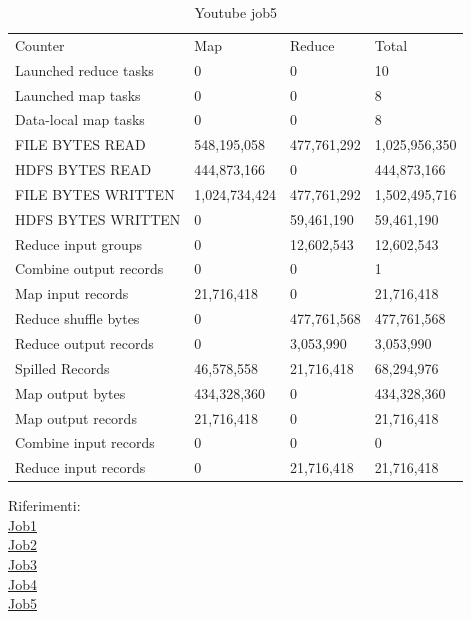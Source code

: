 \documentclass[paper=a4, fontsize=11pt]{scrartcl}	%
\numberwithin{equation}{section}															%
\numberwithin{figure}{section}																%
\numberwithin{table}{section}																%
\begin{document}
\begin{table}[]
	\centering
	\caption{Youtube job5}
	\label{my-label}
	\begin{tabular}{llll}
		Counter&	Map&	Reduce&	Total\\
		Launched reduce tasks&	0&	0&	10\\
		Launched map tasks&	0&	0&	8\\
		Data-local map tasks&	0&	0&	8\\
		FILE BYTES READ&	548,195,058&	477,761,292&	1,025,956,350\\
		HDFS BYTES READ&	444,873,166&	0&	444,873,166\\
		FILE BYTES WRITTEN&	1,024,734,424&	477,761,292&	1,502,495,716\\
		HDFS BYTES WRITTEN&	0&	59,461,190&	59,461,190\\
		Reduce input groups&	0&	12,602,543&	12,602,543\\
		Combine output records&	0&	0&	1\\
		Map input records&	21,716,418&	0&	21,716,418\\
		Reduce shuffle bytes&	0&	477,761,568&	477,761,568\\
		Reduce output records&	0&	3,053,990&	3,053,990\\
		Spilled Records&	46,578,558&	21,716,418&	68,294,976\\
		Map output bytes&	434,328,360&	0&	434,328,360\\
		Map output records&	21,716,418&	0&	21,716,418\\
		Combine input records&	0&	0&	0\\
		Reduce input records&	0&	21,716,418&	21,716,418\\
	\end{tabular}
\end{table}

Riferimenti:\\	
\href{http://hadoop-compute0.di.univr.it:50030/jobdetails.jsp?jobid=job_201603141010_12291}{Job1}\\
\href{http://hadoop-compute0.di.univr.it:50030/jobdetails.jsp?jobid=job_201603141010_12292}{Job2}\\
\href{http://hadoop-compute0.di.univr.it:50030/jobdetails.jsp?jobid=job_201603141010_12293}{Job3}\\
\href{http://hadoop-compute0.di.univr.it:50030/jobdetails.jsp?jobid=job_201603141010_12294}{Job4}\\
\href{http://hadoop-compute0.di.univr.it:50030/jobdetails.jsp?jobid=job_201603141010_12295}{Job5}\\
\end{document}
